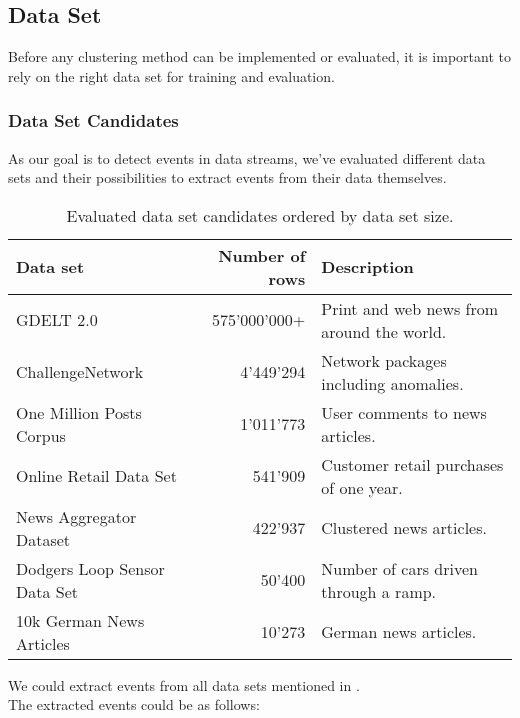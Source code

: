 \subsection{Data Set}
\label{subsec:4a_data_set}

Before any clustering method can be implemented or evaluated,
it is important to rely on the right data set for training and evaluation.

\subsubsection{Data Set Candidates}
\label{subsubsec:4a_data_set_candidates}

As our goal is to detect events in data streams, we've evaluated different data sets and
their possibilities to extract events from their data themselves.

\begin{table}[h]
    \centering
    \begin{tabular}{|l|r|l|}
    \hline
    \textbf{Data set} & \textbf{Number of rows} & \textbf{Description} \\ \hline
    GDELT 2.0 & 575'000'000+ & Print and web news from around the world. \\ \hline
    ChallengeNetwork & 4'449'294 & Network packages including anomalies. \\ \hline
    One Million Posts Corpus & 1'011'773 & User comments to news articles. \\ \hline
    Online Retail Data Set & 541'909 & Customer retail purchases of one year. \\ \hline
    News Aggregator Dataset & 422'937 & Clustered news articles. \\ \hline
    Dodgers Loop Sensor Data Set & 50'400 & Number of cars driven through a ramp. \\ \hline
    10k German News Articles & 10'273 & German news articles. \\ \hline
    \end{tabular}
    \caption{Evaluated data set candidates ordered by data set size.}
    \label{tab:data_set_candidates}
\end{table}

We could extract events from all data sets mentioned in .\\
The extracted events could be as follows:

